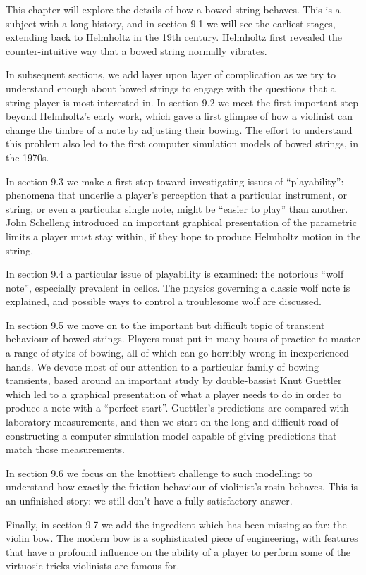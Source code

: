   This chapter will explore the details of how a bowed string behaves. This is 
  a subject with a long history, and in section 9.1 we will see the earliest 
  stages, extending back to Helmholtz in the 19th century. Helmholtz first 
  revealed the counter-intuitive way that a bowed string normally vibrates. 

  In subsequent sections, we add layer upon layer of complication as we try to 
  understand enough about bowed strings to engage with the questions that a 
  string player is most interested in. In section 9.2 we meet the first 
  important step beyond Helmholtz's early work, which gave a first glimpse of 
  how a violinist can change the timbre of a note by adjusting their bowing. 
  The effort to understand this problem also led to the first computer 
  simulation models of bowed strings, in the 1970s. 

  In section 9.3 we make a first step toward investigating issues of 
  ``playability'': phenomena that underlie a player's perception that a 
  particular instrument, or string, or even a particular single note, might be 
  ``easier to play'' than another. John Schelleng introduced an important 
  graphical presentation of the parametric limits a player must stay within, if 
  they hope to produce Helmholtz motion in the string. 

  In section 9.4 a particular issue of playability is examined: the notorious 
  ``wolf note'', especially prevalent in cellos. The physics governing a 
  classic wolf note is explained, and possible ways to control a troublesome 
  wolf are discussed. 

  In section 9.5 we move on to the important but difficult topic of transient 
  behaviour of bowed strings. Players must put in many hours of practice to 
  master a range of styles of bowing, all of which can go horribly wrong in 
  inexperienced hands. We devote most of our attention to a particular family 
  of bowing transients, based around an important study by double-bassist Knut 
  Guettler which led to a graphical presentation of what a player needs to do 
  in order to produce a note with a ``perfect start''. Guettler's predictions 
  are compared with laboratory measurements, and then we start on the long and 
  difficult road of constructing a computer simulation model capable of giving 
  predictions that match those measurements. 

  In section 9.6 we focus on the knottiest challenge to such modelling: to 
  understand how exactly the friction behaviour of violinist's rosin behaves. 
  This is an unfinished story: we still don't have a fully satisfactory answer. 

  Finally, in section 9.7 we add the ingredient which has been missing so far: 
  the violin bow. The modern bow is a sophisticated piece of engineering, with 
  features that have a profound influence on the ability of a player to perform 
  some of the virtuosic tricks violinists are famous for. 

